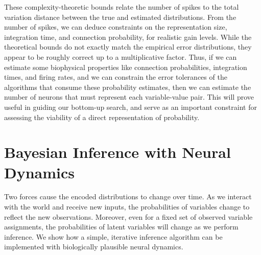 These complexity-theoretic bounds relate the number of spikes to the 
total variation distance between the true and estimated distributions.
From the number of spikes, we can deduce constraints on the representation
size, integration time, and connection probability, for realistic gain levels.
While the theoretical bounds do not exactly match the empirical error 
distributions, they appear to be roughly correct up to a multiplicative 
factor. Thus, if we can estimate some biophysical properties like 
connection probabilities, integration times, and firing rates, 
and we can constrain the error 
tolerances of the algorithms that consume these probability estimates, 
then we can estimate the number of neurons that must represent 
each variable-value pair. This will prove useful in guiding our 
bottom-up search, and serve as an important constraint for assessing 
the viability of a direct representation of probability.


\section{Bayesian Inference with Neural Dynamics}
\label{sec:inference}
Two forces cause the encoded distributions to change over time. As
we interact with the world and receive new inputs, the probabilities
of variables change to reflect the new
observations. Moreover, even for a fixed set of observed variable
assignments, the probabilities of latent variables will change as we
perform inference.
We show how a simple, iterative inference algorithm can be
implemented with biologically plausible neural dynamics.

